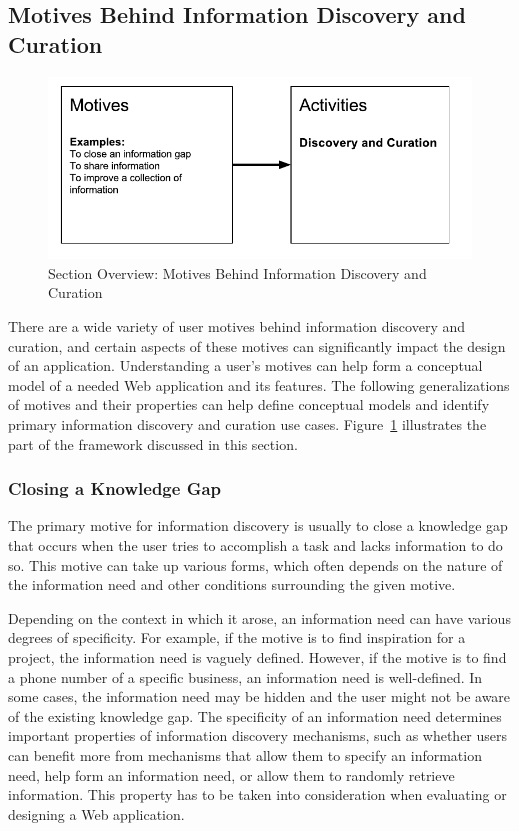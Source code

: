 \documentclass{sigchi}
\begin{document}
{\subsection{Motives Behind Information Discovery and Curation}
\begin{figure}[ht!]
	\noindent
	\centering
    \includegraphics[width=\linewidth]{figures/motives.pdf}
	\caption{Section Overview: Motives Behind Information Discovery and Curation}
	\label{fig:motives} 
\end{figure}

There are a wide variety of user motives behind information discovery and curation, and certain aspects of these motives can significantly impact the design of an application. Understanding a user's motives can help form a conceptual model of a needed Web application and its features. The following generalizations of motives and their properties can help define conceptual models and identify primary information discovery and curation use cases. Figure~\ref{fig:motives} illustrates the part of the framework discussed in this section.  

{\subsubsection{Closing a Knowledge Gap}
The primary motive for information discovery is usually to close a knowledge gap that occurs when the user tries to accomplish a task and lacks information to do so. This motive can take up various forms, which often depends on the nature of the information need and other conditions surrounding the given motive.        

Depending on the context in which it arose, an information need can have various degrees of specificity. For example, if the motive is to find inspiration for a project, the information need is vaguely defined. However, if the motive is to find a phone number of a specific business, an information need is well-defined. In some cases, the information need may be hidden and the user might not be aware of the existing knowledge gap. The specificity of an information need determines important properties of information discovery mechanisms, such as whether users can benefit more from mechanisms that allow them to specify an information need, help form an information need, or allow them to randomly retrieve information. This property has to be taken into consideration when evaluating or designing a Web application. 

}}
\end{document}
